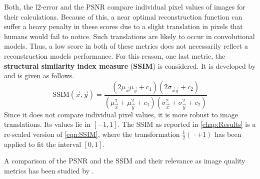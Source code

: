 Both, the l2-error and the PSNR compare individual pixel values of images for their calculations.
Because of this, 
a near optimal reconstruction function can suffer a heavy penalty
in these scores due to a slight translation in pixels 
that humans would fail to notice.
Such translations are likely to occur in convolutional models.
Thus, a low score in both of these metrics 
does not necessarily reflect a reconstruction models performance. 
For this reason, one last metric, 
the \textbf{structural similarity index measure} (\textbf{SSIM}) is considered. 
It is developed by \cite{SSIM} and is given as follows.
\begin{equation}
\label{eqn:SSIM}   
    \text{SSIM}(\vec x, \vec y) 
    = \frac {(2 \mu_{\vec x} \mu_{\vec y} + c_1)(2\sigma_{\vec x\vec y} + c_2)}
    {(\mu_{\vec x}^2 + \mu_{\vec y}^2 + c_1)(\sigma_{\vec x}^2 + \sigma_{\vec y}^2 + c_2)}
\end{equation}
Since it does not compare individual pixel values, it is more robust to 
image translations. Its values lie in $[-1,1]$.
The SSIM as reported in \cref{chap:Results} is a re-scaled version of \cref{eqn:SSIM},
where the transformation $\frac 1 2( \,\cdot + 1)$ has been applied to fit the interval $[0, 1]$.

A comparison of the PSNR and the SSIM and their relevance as image quality metrics has been studied by \cite{PSNRvsSSIM}.
